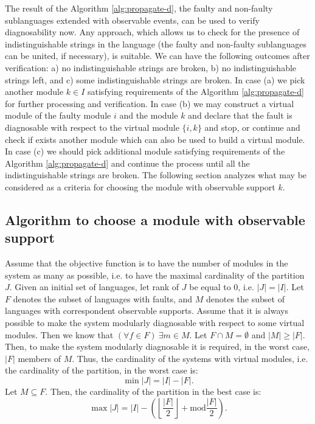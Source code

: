 The result of the Algorithm \ref{alg:propagate-d}, the faulty and non-faulty
sublanguages extended with observable events, can be used to verify
diagnosability now. Any approach, which allows us to check for the presence of
indistinguishable strings in the language (the faulty and non-faulty
sublanguages can be united, if necessary), is suitable. We can have the
following outcomes after verification: a) no indistinguishable strings are
broken, b) no indistinguishable strings left, and c) some indistinguishable
strings are broken. In case (a) we pick another module $k \in I$ satisfying
requirements of the Algorithm \ref{alg:propagate-d} for further processing and
verification. In case (b) we may construct a virtual module of the faulty module
$i$ and the module $k$ and declare that the fault is diagnosable with respect to
the virtual module $\{i, k\}$ and stop, or continue and check if exists another
module which can also be used to build a virtual module. In case (c) we should
pick additional module satisfying requirements of the Algorithm
\ref{alg:propagate-d} and continue the process until all the indistinguishable
strings are broken. The following section analyzes what may be considered as a
criteria for choosing the module with observable support $k$.


\subsection{Algorithm to choose a module with observable support}
Assume that the objective function is to have the number of modules in the
system as many as possible, i.e. to have the maximal cardinality of the
partition $J$.
Given an initial set of languages, let rank of $J$ be equal to 0, i.e. $|J| =
|I|$. Let $F$ denotes the subset of languages with faults, and $M$ denotes the
subset of languages with correspondent observable supports.
Assume that it is always possible to make the system modularly diagnosable with
respect to some virtual modules. Then we know that $(\forall f \in F)~\exists m
\in M$. Let $F \cap M = \emptyset$ and $|M| \geq |F|$. Then, to make the system
modularly diagnosable it is required, in the worst case, $|F|$ members of $M$.
Thus, the cardinality of the systems with virtual modules, i.e. the cardinality
of the partition, in the worst case is:
\begin{equation}
	\min |J| = |I| - |F|.
\end{equation}
Let $M \subseteq F$. Then, the cardinality of the partition in the best case
is:
\begin{equation}
	\max |J| = |I| - \left(
		\left\lfloor \frac{|F|}{2} \right\rfloor + \textrm{mod} \frac{|F|}{2}
		\right). 
\end{equation}

